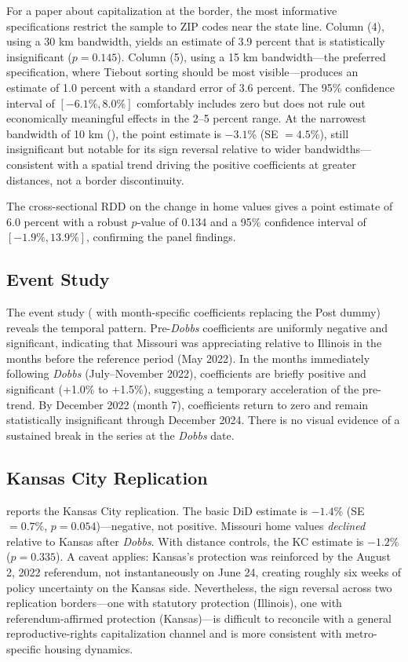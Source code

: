 \documentclass[12pt]{article}
\begin{document}
For a paper about capitalization at the border, the most informative specifications restrict the sample to ZIP codes near the state line. Column (4), using a 30 km bandwidth, yields an estimate of 3.9 percent that is statistically insignificant ($p = 0.145$). Column (5), using a 15 km bandwidth---the preferred specification, where Tiebout sorting should be most visible---produces an estimate of 1.0 percent with a standard error of 3.6 percent. The 95\% confidence interval of $[-6.1\%, 8.0\%]$ comfortably includes zero but does not rule out economically meaningful effects in the 2--5 percent range. At the narrowest bandwidth of 10 km (), the point estimate is $-3.1$\% (SE $= 4.5$\%), still insignificant but notable for its sign reversal relative to wider bandwidths---consistent with a spatial trend driving the positive coefficients at greater distances, not a border discontinuity.

The cross-sectional RDD on the change in home values gives a point estimate of 6.0 percent with a robust $p$-value of 0.134 and a 95\% confidence interval of $[-1.9\%, 13.9\%]$, confirming the panel findings.

\subsection{Event Study}

The event study ( with month-specific coefficients replacing the Post dummy) reveals the temporal pattern. Pre-\textit{Dobbs} coefficients are uniformly negative and significant, indicating that Missouri was appreciating relative to Illinois in the months before the reference period (May 2022). In the months immediately following \textit{Dobbs} (July--November 2022), coefficients are briefly positive and significant (+1.0\% to +1.5\%), suggesting a temporary acceleration of the pre-trend. By December 2022 (month 7), coefficients return to zero and remain statistically insignificant through December 2024. There is no visual evidence of a sustained break in the series at the \textit{Dobbs} date.

\subsection{Kansas City Replication}



 reports the Kansas City replication. The basic DiD estimate is $-1.4$\% (SE $= 0.7\%$, $p = 0.054$)---negative, not positive. Missouri home values \textit{declined} relative to Kansas after \textit{Dobbs}. With distance controls, the KC estimate is $-1.2$\% ($p = 0.335$). A caveat applies: Kansas's protection was reinforced by the August 2, 2022 referendum, not instantaneously on June 24, creating roughly six weeks of policy uncertainty on the Kansas side. Nevertheless, the sign reversal across two replication borders---one with statutory protection (Illinois), one with referendum-affirmed protection (Kansas)---is difficult to reconcile with a general reproductive-rights capitalization channel and is more consistent with metro-specific housing dynamics.
\end{document}
